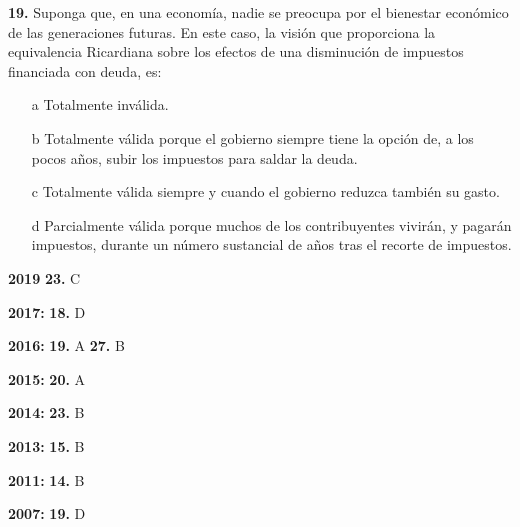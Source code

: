 \documentclass{nuevotema}
\begin{document}
\textbf{19.} Suponga que, en una economía, nadie se preocupa por el bienestar económico de las generaciones futuras. En este caso, la visión que proporciona la equivalencia Ricardiana sobre los efectos de una disminución de impuestos financiada con deuda, es:

\begin{itemize}
	\item[a] Totalmente inválida.
	\item[b] Totalmente válida porque el gobierno siempre tiene la opción de, a los pocos años, subir los impuestos para saldar la deuda.
	\item[c] Totalmente válida siempre y cuando el gobierno reduzca también su gasto.
	\item[d] Parcialmente válida porque muchos de los contribuyentes vivirán, y pagarán impuestos, durante un número sustancial de años tras el recorte de impuestos.
\end{itemize}

\notas

\textbf{2019} \textbf{23.} C

\textbf{2017:} \textbf{18.} D

\textbf{2016:} \textbf{19.} A \textbf{27.} B

\textbf{2015:} \textbf{20.} A

\textbf{2014:} \textbf{23.} B

\textbf{2013:} \textbf{15.} B

\textbf{2011:} \textbf{14.} B

\textbf{2007:} \textbf{19.} D

\bibliografia
\end{document}
